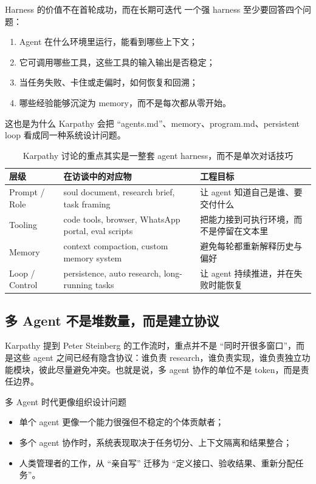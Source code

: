 \documentclass[a4paper]{article}
\begin{document}
\begin{importantbox}{Harness 的价值不在首轮成功，而在长期可迭代}
一个强 harness 至少要回答四个问题：
\begin{enumerate}
    \item Agent 在什么环境里运行，能看到哪些上下文；
    \item 它可调用哪些工具，这些工具的输入输出是否稳定；
    \item 当任务失败、卡住或走偏时，如何恢复和回溯；
    \item 哪些经验能够沉淀为 memory，而不是每次都从零开始。
\end{enumerate}
这也是为什么 Karpathy 会把 ``agents.md''、memory、program.md、persistent loop 看成同一种系统设计问题。
\end{importantbox}

\begin{table}[H]
\centering
\begin{tabular}{p{2.6cm}p{4.1cm}p{5.2cm}}
\toprule
\textbf{层级} & \textbf{在访谈中的对应物} & \textbf{工程目标} \\
\midrule
Prompt / Role & soul document, research brief, task framing & 让 agent 知道自己是谁、要交付什么 \\
Tooling & code tools, browser, WhatsApp portal, eval scripts & 把能力接到可执行环境，而不是停留在文本里 \\
Memory & context compaction, custom memory system & 避免每轮都重新解释历史与偏好 \\
Loop / Control & persistence, auto research, long-running tasks & 让 agent 持续推进，并在失败时能恢复 \\
\bottomrule
\end{tabular}
\caption{Karpathy 讨论的重点其实是一整套 agent harness，而不是单次对话技巧}
\end{table}

\subsection{多 Agent 不是堆数量，而是建立协议}
Karpathy 提到 Peter Steinberg 的工作流时，重点并不是 ``同时开很多窗口''，而是这些 agent 之间已经有隐含协议：谁负责 research，谁负责实现，谁负责独立功能模块，彼此尽量避免冲突。也就是说，多 agent 协作的单位不是 token，而是责任边界。

\begin{knowledgebox}{多 Agent 时代更像组织设计问题}
\begin{itemize}
    \item 单个 agent 更像一个能力很强但不稳定的个体贡献者；
    \item 多个 agent 协作时，系统表现取决于任务切分、上下文隔离和结果整合；
    \item 人类管理者的工作，从 ``亲自写'' 迁移为 ``定义接口、验收结果、重新分配任务''。
\end{itemize}
\end{knowledgebox}
\end{document}
